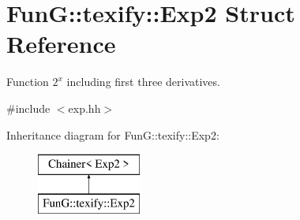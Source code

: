 \hypertarget{structFunG_1_1texify_1_1Exp2}{\section{Fun\-G\-:\-:texify\-:\-:Exp2 Struct Reference}
\label{structFunG_1_1texify_1_1Exp2}
}


Function $2^x$ including first three derivatives.  




{\ttfamily \#include $<$exp.\-hh$>$}

Inheritance diagram for Fun\-G\-:\-:texify\-:\-:Exp2\-:\begin{figure}[H]
\begin{center}
\leavevmode
\includegraphics[height=2.000000cm]{structFunG_1_1texify_1_1Exp2}
\end{center}
\end{figure}
